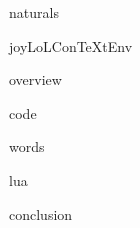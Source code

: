 
\usemodule[t-diSimp]

\startDiSimpComponent naturals

\diSimpEnvironment joyLoLConTeXtEnv

\startJoyLoLCoAlg[title=Naturals][naturals]

\diSimpComponent overview

\diSimpComponent code

\diSimpComponent words

\diSimpComponent lua

\diSimpComponent conclusion

\stopJoyLoLCoAlg

\stopDiSimpComponent
